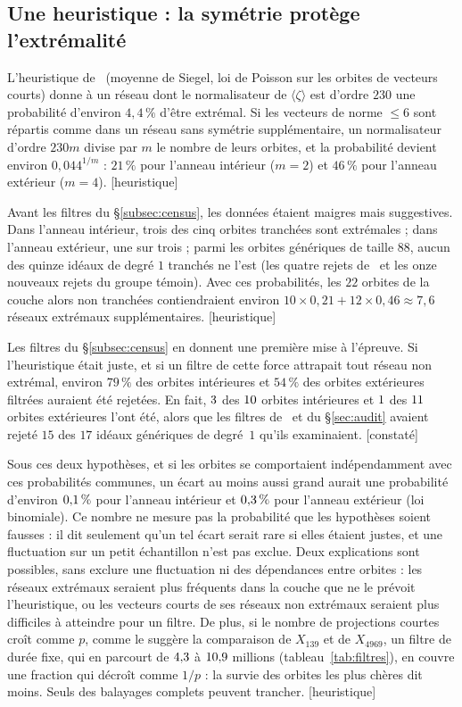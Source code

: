 \documentclass[11pt,a4paper]{amsart}
\theoremstyle{plain}
\theoremstyle{definition}
\newcommand{\st}[1]{\textup{\textsf{\small[#1]}}}
\newcommand{\CONS}{\st{constaté}}
\newcommand{\HEUR}{\st{heuristique}}
\begin{document}
\subsection{Une heuristique : la symétrie protège l'extrémalité}\label{subsec:heur}
L'heuristique de~\cite[(Q2)]{Gau26} (moyenne de Siegel, loi de Poisson sur les orbites de vecteurs courts) donne à un réseau dont le normalisateur de $\langle\zeta\rangle$ est d'ordre $230$ une probabilité d'environ $4{,}4\,\%$ d'être extrémal. Si les vecteurs de norme $\le6$ sont répartis comme dans un réseau sans symétrie supplémentaire, un normalisateur d'ordre $230m$ divise par $m$ le nombre de leurs orbites, et la probabilité devient environ $0{,}044^{1/m}$ : $21\,\%$ pour l'anneau intérieur ($m=2$) et $46\,\%$ pour l'anneau extérieur ($m=4$). \HEUR

Avant les filtres du \S\ref{subsec:census}, les données étaient maigres mais suggestives. Dans l'anneau intérieur, trois des cinq orbites tranchées sont extrémales ; dans l'anneau extérieur, une sur trois ; parmi les orbites génériques de taille $88$, aucun des quinze idéaux de degré $1$ tranchés ne l'est (les quatre rejets de~\cite{Gau26} et les onze nouveaux rejets du groupe témoin). Avec ces probabilités, les $22$ orbites de la couche alors non tranchées contiendraient environ $10\times0{,}21+12\times0{,}46\approx7{,}6$ réseaux extrémaux supplémentaires. \HEUR

Les filtres du \S\ref{subsec:census} en donnent une première mise à l'épreuve. Si l'heuristique était juste, et si un filtre de cette force attrapait tout réseau non extrémal, environ $79\,\%$ des orbites intérieures et $54\,\%$ des orbites extérieures filtrées auraient été rejetées. En fait, $3$ des $10$ orbites intérieures et $1$ des $11$ orbites extérieures l'ont été, alors que les filtres de~\cite{Gau26} et du \S\ref{sec:audit} avaient rejeté $15$ des $17$ idéaux génériques de degré~$1$ qu'ils examinaient. \CONS

Sous ces deux hypothèses, et si les orbites se comportaient indépendamment avec ces probabilités communes, un écart au moins aussi grand aurait une probabilité d'environ $0{,}1\,\%$ pour l'anneau intérieur et $0{,}3\,\%$ pour l'anneau extérieur (loi binomiale). Ce nombre ne mesure pas la probabilité que les hypothèses soient fausses : il dit seulement qu'un tel écart serait rare si elles étaient justes, et une fluctuation sur un petit échantillon n'est pas exclue. Deux explications sont possibles, sans exclure une fluctuation ni des dépendances entre orbites : les réseaux extrémaux seraient plus fréquents dans la couche que ne le prévoit l'heuristique, ou les vecteurs courts de ses réseaux non extrémaux seraient plus difficiles à atteindre pour un filtre. De plus, si le nombre de projections courtes croît comme $p$, comme le suggère la comparaison de $X_{139}$ et de $X_{4969}$, un filtre de durée fixe, qui en parcourt de $4{,}3$ à $10{,}9$ millions (tableau~\ref{tab:filtres}), en couvre une fraction qui décroît comme $1/p$ : la survie des orbites les plus chères dit moins. Seuls des balayages complets peuvent trancher. \HEUR
\end{document}
